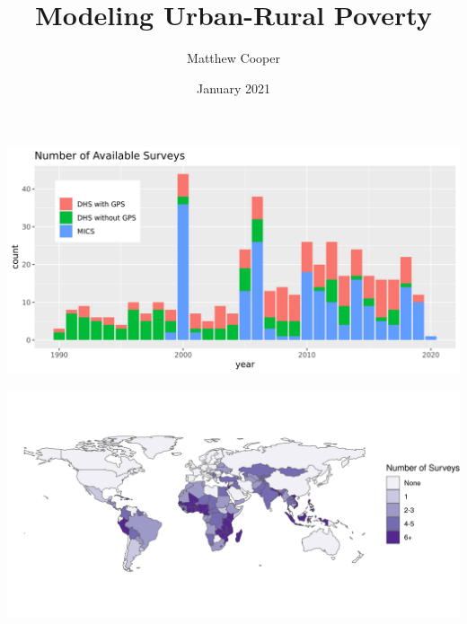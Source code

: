 \documentclass[aspectratio=169]{beamer}
\title{Modeling Urban-Rural Poverty}
\author{Matthew Cooper}
\institute{World Data Lab}
\date{January 2021}
\begin{document}
\frame{\titlepage}

\begin{frame}
\includegraphics[width=\textwidth]{../res/Survey_count_time.png}
\end{frame}

\begin{frame}
\includegraphics[width=\textwidth]{../res/Survey_count_space.png}
\end{frame}
\end{document}
